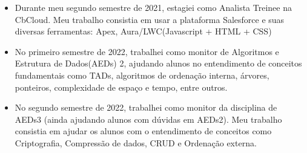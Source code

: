\documentclass[10pt,a4paper,ragged2e]{altacv}
\begin{document}
{}
\begin{itemize}
\item Durante meu segundo semestre de 2021, estagiei como Analista Treinee na CbCloud. Meu trabalho consistia em usar a 
plataforma Salesforce e suas diversas ferramentas: Apex, Aura/LWC(Javascript + HTML + CSS) 
\end{itemize}
\begin{itemize}
\item No primeiro semestre de 2022, trabalhei como monitor de Algoritmos e Estrutura de Dados(AEDs) 2, ajudando alunos no 
entendimento de conceitos fundamentais como TADs, algoritmos de ordenação interna, árvores, ponteiros, 
complexidade de espaço e tempo, entre outros.
\item No segundo semestre de 2022, trabalhei como monitor da disciplina de AEDs3 
(ainda ajudando alunos com dúvidas em AEDs2). Meu trabalho consistia em ajudar os alunos 
com o entendimento de conceitos como Criptografia, Compressão de dados, 
CRUD e Ordenação externa.  
\end{itemize}

\divider

\end{document}
